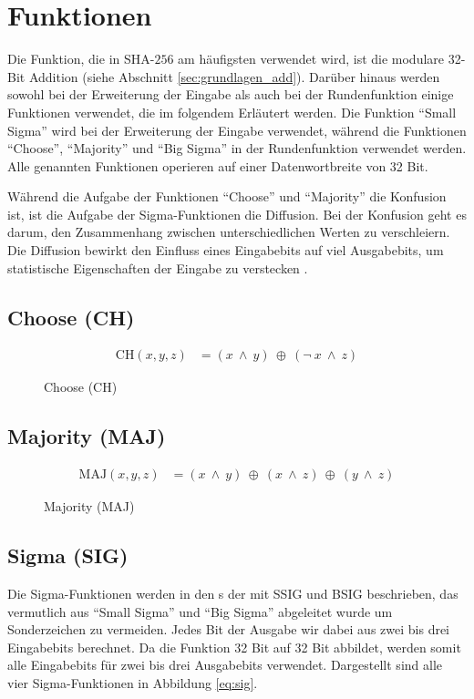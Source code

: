 \section{Funktionen}
\label{sec:sha256:funktionen}

Die Funktion, die in SHA-$256$ am häufigsten verwendet wird, ist die modulare 32-Bit Addition (siehe Abschnitt \ref{sec:grundlagen_add}).
Darüber hinaus werden sowohl bei der Erweiterung der Eingabe als auch bei der Rundenfunktion einige Funktionen verwendet, die im folgendem Erläutert werden.
Die Funktion "`Small Sigma"' wird bei der Erweiterung der Eingabe verwendet, während die Funktionen "`Choose"', "`Majority"' und "`Big Sigma"' in der Rundenfunktion
verwendet werden. Alle genannten Funktionen operieren auf einer Datenwortbreite von 32 Bit.

Während die Aufgabe der Funktionen "`Choose"' und "`Majority"' die Konfusion ist, ist die Aufgabe der Sigma-Funktionen die Diffusion.
Bei der Konfusion geht es darum, den Zusammenhang zwischen unterschiedlichen Werten zu verschleiern. Die Diffusion bewirkt den Einfluss
eines Eingabebits auf viel Ausgabebits, um statistische Eigenschaften der Eingabe zu verstecken \cite[57]{crypto1}.

\subsection{Choose (CH)}
\begin{figure}[!h]
  \begin{align}
  \text{CH}( x, y, z) &= (x~\wedge~y)~\oplus~( \neg~x~\wedge~z) \nonumber
  \end{align}
  \caption{Choose (CH)}
  \label{eq:ch}
\end{figure}

\subsection{Majority (MAJ)}
\begin{figure}[!h]
  \begin{align}
  \text{MAJ}( x, y, z) &= (x~\wedge~y)~\oplus~(x~\wedge~z)~\oplus~(y~\wedge~z) \nonumber
  \end{align}
  \caption{Majority (MAJ)}
  \label{eq:maj}
\end{figure}

\subsection{Sigma (SIG)}
Die Sigma-Funktionen werden in den s der  mit SSIG und BSIG beschrieben, das vermutlich aus "`Small Sigma"' und "`Big Sigma"' abgeleitet wurde
um Sonderzeichen zu vermeiden. Jedes Bit der Ausgabe wir dabei aus zwei bis drei Eingabebits berechnet. Da die Funktion 32 Bit auf 32 Bit abbildet, werden somit alle
Eingabebits für zwei bis drei Ausgabebits verwendet. Dargestellt sind alle vier Sigma-Funktionen in Abbildung \eqref{eq:sig}. 

